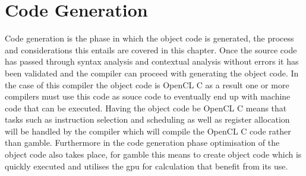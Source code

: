 \chapter{Code Generation}
Code generation is the phase in which the object code is generated, the process and considerations this entails are covered in this chapter.
Once the source code has passed through syntax analysis and contextual analysis without errors it has been validated and the compiler can proceed with generating the object code.
In the case of this compiler the object code is OpenCL C as a result one or more compilers must use this code as souce code to eventually end up with machine code that can be executed.
Having the object code be OpenCL C means that tasks such as instruction selection and scheduling as well as register allocation will be handled by the compiler which will compile the OpenCL C code rather than \gls{gamble}.
Furthermore in the code generation phase optimisation of the object code also takes place, for \gls{gamble} this means to create object code which is quickly executed and utilises the \acrshort{gpu} for calculation that benefit from its use.